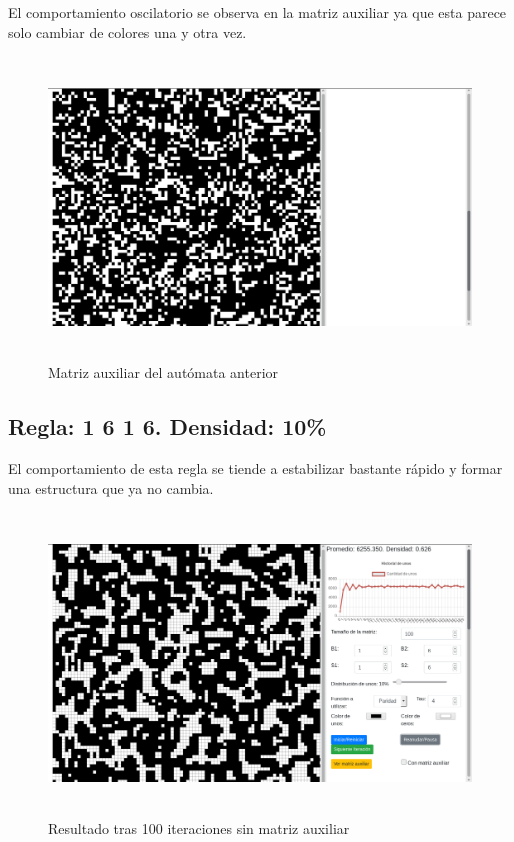 \documentclass[12pt, titlepage]{article}
\begin{document}
El comportamiento oscilatorio se observa en la matriz auxiliar ya que esta parece solo cambiar de colores una y otra vez.
\begin{figure}[H]
\begin{center}
 \includegraphics[width=15cm, height=8cm]{./img/3634-paridad-aux.png}
 \caption{Matriz auxiliar del autómata anterior}
 \label{fig:3634-paridad-aux}
\end{center}
\end{figure}

\subsection{Regla: 1 6 1 6. Densidad: 10\%}
El comportamiento de esta regla se tiende a estabilizar bastante rápido y formar una estructura que ya no cambia.

\begin{figure}[H]
\begin{center}
 \includegraphics[width=15cm, height=8cm]{./img/1616.png}
 \caption{Resultado tras 100 iteraciones sin matriz auxiliar}
 \label{fig:1616}
\end{center}
\end{figure}
\end{document}

